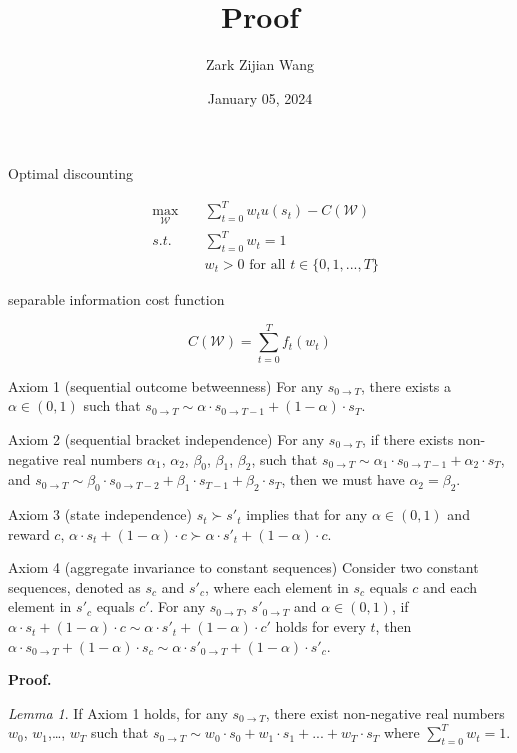 \documentclass[
  12pt,
]{article}
\title{Proof}
\author{Zark Zijian Wang}
\date{January 05, 2024}
\begin{document}
\maketitle

Optimal discounting

\[
\begin{aligned}
&\max_{\mathcal{W}}\;&&\sum_{t=0}^T w_tu(s_t) - C(\mathcal{W}) \\
&s.t.\; &&\sum_{t=0}^Tw_t =1 \\
&&& w_t >0 \text{ for all } t\in \{0,1,...,T\}
\end{aligned}
\]

separable information cost function

\[
C(\mathcal{W})=\sum_{t=0}^Tf_t(w_t)
\]

Axiom 1 (sequential outcome betweenness) For any \(s_{0\rightarrow T}\),
there exists a \(\alpha\in(0,1)\) such that
\(s_{0\rightarrow T} \sim \alpha\cdot s_{0\rightarrow T-1}+(1-\alpha) \cdot s_T\).

Axiom 2 (sequential bracket independence) For any
\(s_{0\rightarrow T}\), if there exists non-negative real numbers
\(\alpha_1\), \(\alpha_2\), \(\beta_0\), \(\beta_1\), \(\beta_2\), such
that
\(s_{0\rightarrow T}\sim \alpha_1 \cdot s_{0\rightarrow T-1} + \alpha_2 \cdot s_{T}\),
and
\(s_{0\rightarrow T}\sim \beta_0 \cdot s_{0\rightarrow T-2}+\beta_1 \cdot s_{T-1}+\beta_2 \cdot s_{T}\),
then we must have \(\alpha_2 = \beta_2\).

Axiom 3 (state independence) \(s_t \succ s'_t\) implies that for any
\(\alpha \in (0,1)\) and reward \(c\),
\(\alpha \cdot s_t + (1-\alpha)\cdot c \succ \alpha \cdot s'_t + (1-\alpha)\cdot c\).

Axiom 4 (aggregate invariance to constant sequences) Consider two
constant sequences, denoted as \(s_c\) and \(s'_c\), where each element
in \(s_c\) equals \(c\) and each element in \(s'_c\) equals \(c'\). For
any \(s_{0\rightarrow T}\), \(s'_{0\rightarrow T}\) and
\(\alpha\in(0,1)\), if
\(\alpha \cdot s_t+(1-\alpha)\cdot c\sim\alpha \cdot s'_t+(1-\alpha)\cdot c'\)
holds for every \(t\), then
\(\alpha \cdot s_{0\rightarrow T}+(1-\alpha)\cdot s_c\sim \alpha \cdot s'_{0\rightarrow T}+(1-\alpha)\cdot s'_c\).

\textbf{Proof.}

\emph{Lemma 1}. If Axiom 1 holds, for any \(s_{0\rightarrow T}\), there
exist non-negative real numbers \(w_0\), \(w_1\),\ldots, \(w_T\) such
that
\(s_{0\rightarrow T} \sim w_0 \cdot s_0 +w_1\cdot s_1 + ...+w_T\cdot s_T\)
where \(\sum_{t=0}^T w_t=1\).
\end{document}

